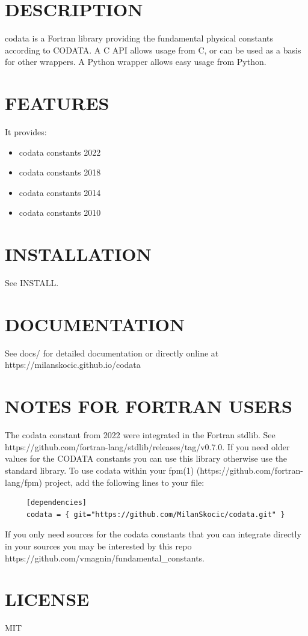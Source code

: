 \section{DESCRIPTION}
codata is a Fortran library providing the fundamental physical
constants according to CODATA. 
A C API allows usage from C, or can be used as a basis for other wrappers.
A Python wrapper allows easy usage from Python.

\section{FEATURES}
It provides:
\begin{itemize}
\item codata constants 2022
\item codata constants 2018
\item codata constants 2014
\item codata constants 2010
\end{itemize}

\section{INSTALLATION}
See INSTALL.

\section{DOCUMENTATION}
See docs/ for detailed documentation or directly online at 
https://milanskocic.github.io/codata

\section{NOTES FOR FORTRAN USERS}
The codata constant from 2022 were integrated in the Fortran stdlib.
See https://github.com/fortran-lang/stdlib/releases/tag/v0.7.0.
If you need older values for the CODATA constants you can use this library 
otherwise use the standard library.
To use codata within your fpm(1) (https://github.com/fortran-lang/fpm)
project, add the following lines to your file:

\begin{verbatim}
     [dependencies]
     codata = { git="https://github.com/MilanSkocic/codata.git" }

\end{verbatim}
If you only need sources for the codata constants that you can integrate
directly in your sources you may be interested by this repo
https://github.com/vmagnin/fundamental\_constants.

\section{LICENSE}
MIT
